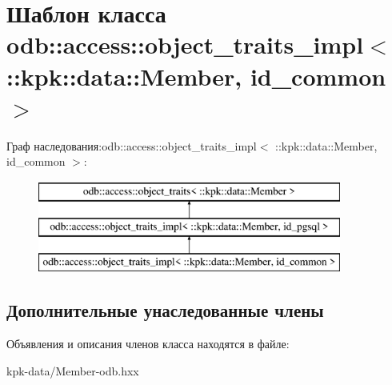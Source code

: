\hypertarget{classodb_1_1access_1_1object__traits__impl_3_01_1_1kpk_1_1data_1_1_member_00_01id__common_01_4}{}\section{Шаблон класса odb\+:\+:access\+:\+:object\+\_\+traits\+\_\+impl$<$ \+:\+:kpk\+:\+:data\+:\+:Member, id\+\_\+common $>$}
\label{classodb_1_1access_1_1object__traits__impl_3_01_1_1kpk_1_1data_1_1_member_00_01id__common_01_4}
Граф наследования\+:odb\+:\+:access\+:\+:object\+\_\+traits\+\_\+impl$<$ \+:\+:kpk\+:\+:data\+:\+:Member, id\+\_\+common $>$\+:\begin{figure}[H]
\begin{center}
\leavevmode
\includegraphics[height=3.000000cm]{classodb_1_1access_1_1object__traits__impl_3_01_1_1kpk_1_1data_1_1_member_00_01id__common_01_4}
\end{center}
\end{figure}
\subsection*{Дополнительные унаследованные члены}


Объявления и описания членов класса находятся в файле\+:\begin{DoxyCompactItemize}
\item 
kpk-\/data/Member-\/odb.\+hxx\end{DoxyCompactItemize}
